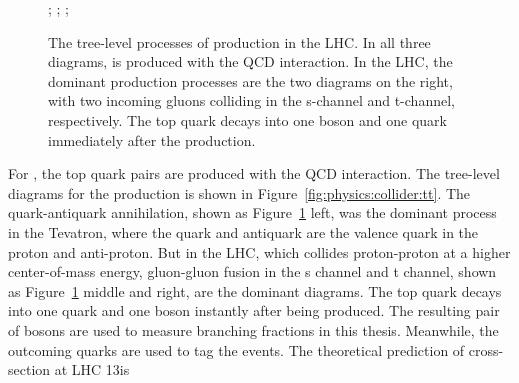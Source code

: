 \begin{figure}[ht]
    \centering
    ; \qquad
    ; \qquad
    ;
    \caption{The tree-level processes of \ttbar production in the LHC. In all three diagrams, \ttbar is produced with the QCD interaction. In the LHC, the dominant production processes are the two diagrams on the right, with two incoming gluons colliding in the s-channel and t-channel, respectively. The top quark decays into one \PW boson and one \PQb quark immediately after the production.}
    \label{fig:physics:ppCollision:tt}
\end{figure}
\noindent For \ttbar, the top quark pairs are produced with the QCD interaction. The tree-level diagrams for the \ttbar production is shown in Figure~\ref{fig:physics:collider:tt}. The quark-antiquark annihilation, shown as Figure~\ref{fig:physics:ppCollision:tt} left, was the dominant process in the Tevatron, where the quark and antiquark are the valence quark in the proton and anti-proton. But in the LHC, which collides proton-proton at a higher center-of-mass energy, gluon-gluon fusion in the s channel and t channel, shown as  Figure~\ref{fig:physics:ppCollision:tt} middle and right, are the dominant diagrams. The top quark decays into one \PQb quark and one \PW boson instantly after being produced. The resulting pair of \PW bosons are used to measure \PW branching fractions in this thesis. Meanwhile, the outcoming \PQb quarks are used to tag the \ttbar events. The theoretical prediction of \ttbar cross-section at LHC 13\TeV is
